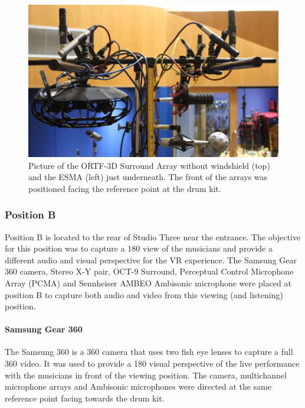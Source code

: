 			\begin{figure}[h]
			\begin{center}
				\includegraphics[width = \linewidth]{images/other/esmapic.PNG}
				\caption{Picture of the ORTF-3D Surround Array without windshield (top) and the ESMA (left) just underneath. The front of the arrays was positioned facing the reference point at the drum kit.}
				\label{esma}
			\end{center}
			\end{figure}

		\subsubsection{Position B}
			Position B is located to the rear of Studio Three near the entrance. The objective for this position was to capture a 180\textdegree{} view of the musicians and provide a different audio and visual perspective for the VR experience. The Samsung Gear 360 camera, Stereo X-Y pair, OCT-9 Surround, Perceptual Control Microphone Array (PCMA) and Sennheiser AMBEO Ambisonic microphone were placed at position B to capture both audio and video from this viewing (and listening) position.\\

			\paragraph{Samsung Gear 360}
			The Samsung 360 \cite{GearVR} is a 360\textdegree{} camera that uses two fish eye lenses to capture a full 360\textdegree{} video. It was used to provide a 180\textdegree{} visual perspective of the live performance with the musicians in front of the viewing position. The camera, multichannel microphone arrays and Ambisonic microphones were directed at the same reference point facing towards the drum kit. \\

